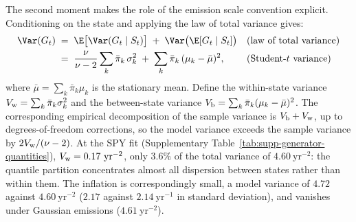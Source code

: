 The second moment makes the role of the emission scale convention
explicit. Conditioning on the state and applying the law of total
variance gives:
\begin{align}
  \Var(G_t)
   &\;=\; \E\big[\Var(G_t \mid S_t)\big]
     \;+\; \Var\big(\E[G_t \mid S_t]\big)
     && \text{(law of total variance)} \notag \\
   &\;=\; \frac{\nu}{\nu - 2} \sum_k \bar\pi_k\, \sigma_k^2
     \;+\; \sum_k \bar\pi_k\, (\mu_k - \bar\mu)^2,
     && \text{(Student-$t$ variance)}
  \label{eq:supp-variance}
\end{align}
where $\bar\mu = \sum_k \bar\pi_k \mu_k$ is the stationary mean.
Define the within-state variance $V_{\rm w} = \sum_k \bar\pi_k
\sigma_k^2$ and the between-state variance $V_{\rm b} = \sum_k
\bar\pi_k (\mu_k - \bar\mu)^2$. The corresponding empirical
decomposition of the sample variance is $V_{\rm b} + V_{\rm w}$, up to
degrees-of-freedom corrections, so the model variance exceeds the
sample variance by $2 V_{\rm w} / (\nu - 2)$. At the SPY fit
(Supplementary Table~\ref{tab:supp-generator-quantities}),
$V_{\rm w} = 0.17~\mathrm{yr}^{-2}$, only $3.6\%$ of the total
variance of $4.60~\mathrm{yr}^{-2}$: the quantile partition
concentrates almost all dispersion between states rather than within
them. The inflation is correspondingly small, a model variance of
$4.72$ against $4.60~\mathrm{yr}^{-2}$ ($2.17$ against
$2.14~\mathrm{yr}^{-1}$ in standard deviation), and vanishes
under Gaussian emissions ($4.61~\mathrm{yr}^{-2}$).

